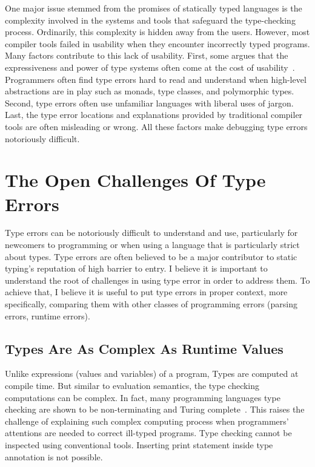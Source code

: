 One major issue stemmed from the promises of statically typed languages is the complexity involved in the systems and tools that safeguard the type-checking process. Ordinarily, this complexity is hidden away from the users. However, most compiler tools failed in usability when they encounter incorrectly typed programs. Many factors contribute to this lack of usability. First, some argues that the expressiveness and power of type systems often come at the cost of usability~\cite{Hage2020-hg}.  Programmers often find type errors hard to read and understand when high-level abstractions are in play such as monads, type classes, and polymorphic types. Second, type errors often use unfamiliar languages with liberal uses of jargon. Last, the type error locations and explanations provided by traditional compiler tools are often misleading or wrong. All these factors make debugging type errors notoriously difficult.

\section{The Open Challenges Of Type Errors}

Type errors can be notoriously difficult to understand and use, particularly for newcomers to programming or when using a language that is particularly strict about types. Type errors are often believed to be a major contributor to static typing's reputation of high barrier to entry. I believe it is important to understand the root of challenges in using type error in order to address them. To achieve that, I believe it is useful to put type errors in proper context, more specifically, comparing them with other classes of programming errors (parsing errors, runtime errors). 

\subsection{Types Are As Complex As Runtime Values}

Unlike expressions (values and variables) of a program, Types are computed at compile time. But similar to evaluation semantics, the type checking computations can be complex. In fact, many programming languages type checking are shown to be non-terminating and Turing complete~\cite{Wells1999-ob}. This raises the challenge of explaining such complex computing process when programmers' attentions are needed to correct ill-typed programs. Type checking cannot be inspected using conventional tools. Inserting print statement inside type annotation is not possible. 


